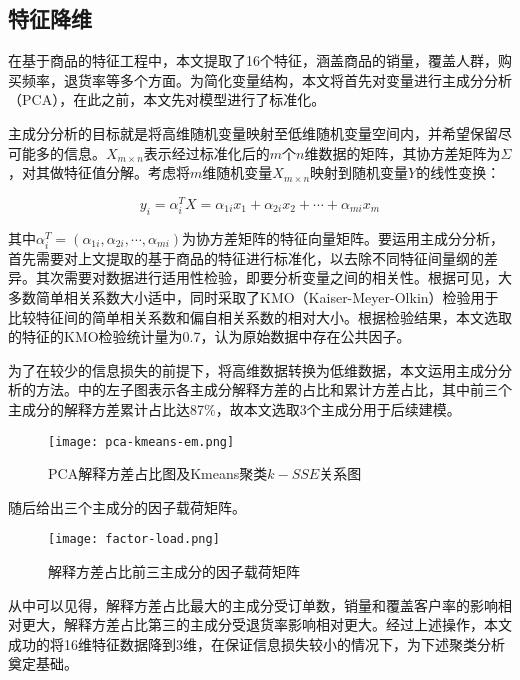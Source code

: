 \documentclass[lang=cn,11pt,a4paper,cite=authoryear]{elegantpaper}
\begin{document}
\subsection{特征降维}

在基于商品的特征工程中，本文提取了16个特征，涵盖商品的销量，覆盖人群，购买频率，退货率等多个方面。为简化变量结构，本文将首先对变量进行主成分分析（PCA），在此之前，本文先对模型进行了标准化。

主成分分析的目标就是将高维随机变量映射至低维随机变量空间内，并希望保留尽可能多的信息。$X_{m \times n}$表示经过标准化后的$m$个$n$维数据的矩阵，其协方差矩阵为$\Sigma$，对其做特征值分解。考虑将$m$维随机变量$X_{m \times n}$映射到随机变量$Y$的线性变换：

\begin{equation}
  y_i = \alpha_{i}^T X = \alpha_{1i}x_1 +\alpha_{2i} x_2 + \cdots + \alpha_{mi} x_m
\end{equation}

其中$\alpha_i^T = (\alpha_{1i}, \alpha_{2i}, \cdots, \alpha_{mi})$为协方差矩阵的特征向量矩阵。要运用主成分分析，首先需要对上文提取的基于商品的特征进行标准化，以去除不同特征间量纲的差异。其次需要对数据进行适用性检验，即要分析变量之间的相关性。根据可见，大多数简单相关系数大小适中，同时采取了KMO（Kaiser-Meyer-Olkin）检验用于比较特征间的简单相关系数和偏自相关系数的相对大小。根据检验结果，本文选取的特征的KMO检验统计量为0.7，认为原始数据中存在公共因子。

为了在较少的信息损失的前提下，将高维数据转换为低维数据，本文运用主成分分析的方法。中的左子图表示各主成分解释方差的占比和累计方差占比，其中前三个主成分的解释方差累计占比达87\%，故本文选取3个主成分用于后续建模。
\begin{figure}[H]
  \centering
  \texttt{[image: pca-kmeans-em.png]}
  \caption{PCA解释方差占比图及Kmeans聚类$k-SSE$关系图}
  \label{主成分聚类}
\end{figure}

随后给出三个主成分的因子载荷矩阵。
\begin{figure}[H]
  \centering
  \texttt{[image: factor-load.png]}
  \caption{解释方差占比前三主成分的因子载荷矩阵}
  \label{因子载荷矩阵}
\end{figure}

从中可以见得，解释方差占比最大的主成分受订单数，销量和覆盖客户率的影响相对更大，解释方差占比第三的主成分受退货率影响相对更大。经过上述操作，本文成功的将16维特征数据降到3维，在保证信息损失较小的情况下，为下述聚类分析奠定基础。
\end{document}
